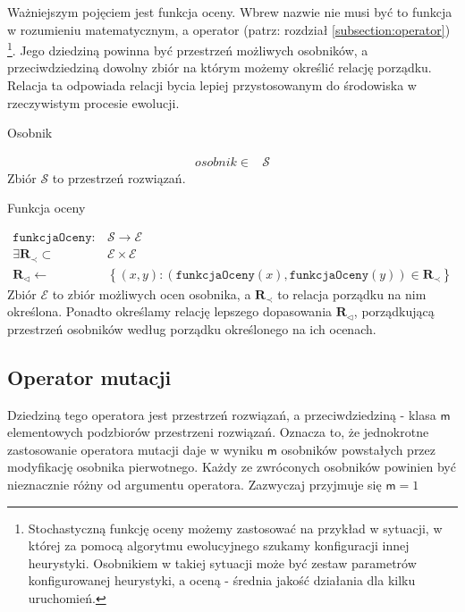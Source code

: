 \documentclass[twoside]{iisthesis}
\newcommand{\important}[1]{\mathcal{#1}}
\newcommand{\R}{\mathbf{R}}
\newcommand{\minorityEvalRel}{{\R}_{\prec}}
\newcommand{\minoritySpecimenRel}{{\R}_{\lhd}}
\newcommand{\param}[1]{\mathtt{#1}}
\newcommand{\variable}[1]{\mathsf{#1}}
\begin{document}
Ważniejszym pojęciem jest funkcja oceny. 
Wbrew nazwie nie musi być to funkcja w rozumieniu matematycznym, a operator (patrz: rozdział \ref{subsection:operator})
\footnote{Stochastyczną funkcję oceny możemy zastosować na przykład w sytuacji, w której za pomocą algorytmu ewolucyjnego szukamy konfiguracji innej heurystyki. Osobnikiem w takiej sytuacji może być zestaw parametrów konfigurowanej heurystyki, a oceną - średnia jakość działania dla kilku uruchomień.}. 
Jego dziedziną powinna być przestrzeń możliwych osobników, a przeciwdziedziną dowolny zbiór na którym możemy określić relację porządku. 
Relacja ta odpowiada relacji bycia lepiej przystosowanym do środowiska w rzeczywistym procesie ewolucji.


\begin{signature}
	\caption{Osobnik \label{signature:specimen}}
	\begin{align}
	osobnik \in &\important{S}
	\end{align}
	Zbiór $\important{S}$ to przestrzeń rozwiązań.
\end{signature}

\begin{signature}
	\caption{Funkcja oceny \label{signature:eval}}
	\begin{align}
		\param{funkcjaOceny}: &\important{S} \rightarrow \important{E} \\
		\exists \minorityEvalRel \subset &\important{E} \times \important{E} \\
		\minoritySpecimenRel \gets &\left\{ (x, y): (\param{funkcjaOceny}(x), \param{funkcjaOceny}(y)) \in \minorityEvalRel \right\}
	\end{align}
	Zbiór $\important{E}$ to zbiór możliwych ocen osobnika, 
	a $\minorityEvalRel$ to relacja porządku na nim określona. Ponadto określamy relację lepszego dopasowania $\minoritySpecimenRel$, porządkującą przestrzeń osobników według porządku określonego na ich ocenach. 
\end{signature}

\subsection{Operator mutacji}

Dziedziną tego operatora jest przestrzeń rozwiązań, a przeciwdziedziną - klasa $\variable{m}$elementowych podzbiorów przestrzeni rozwiązań. Oznacza to, że jednokrotne zastosowanie operatora mutacji daje w wyniku $\variable{m}$ osobników powstałych przez modyfikację osobnika pierwotnego. Każdy ze zwróconych osobników powinien być nieznacznie różny od argumentu operatora. Zazwyczaj przyjmuje się $\variable{m} = 1$
\end{document}
